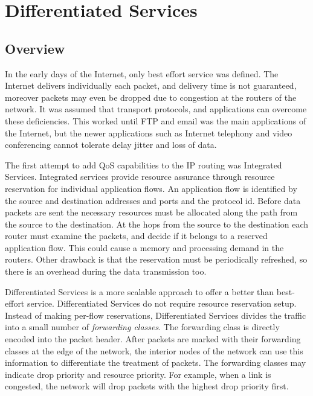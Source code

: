 \chapter{Differentiated Services}
\label{cha:diffserv}


\section{Overview}

In the early days of the Internet, only best effort service was defined.
The Internet delivers individually each packet, and delivery time is not
guaranteed, moreover packets may even be dropped due to congestion at
the routers of the network. It was assumed that transport protocols,
and applications can overcome these deficiencies. This worked until
FTP and email was the main applications of the Internet, but the newer
applications such as Internet telephony and video conferencing cannot
tolerate delay jitter and loss of data.


The first attempt to add QoS capabilities to the IP routing was
Integrated Services. Integrated services provide resource assurance
through resource reservation for individual application flows.
An application flow is identified by the source and destination
addresses and ports and the protocol id. Before data packets are
sent the necessary resources must be allocated along the path
from the source to the destination. At the hops from the source
to the destination each router must examine the packets, and decide
if it belongs to a reserved application flow. This could cause a
memory and processing demand in the routers.
Other drawback is that
the reservation must be periodically refreshed, so there is an overhead
during the data transmission too.

Differentiated Services is a more scalable approach to offer a better than
best-effort service. Differentiated Services do not require resource reservation
setup. Instead of making per-flow reservations, Differentiated
Services divides the traffic into a small number of \emph{forwarding classes}.
The forwarding class is directly encoded into the packet header. After packets are
marked with their forwarding classes at the edge of the network, the interior nodes
of the network can use this information to differentiate the treatment of packets.
The forwarding classes may indicate drop priority and resource priority. For example,
when a link is congested, the network will drop packets with the highest drop priority
first.

